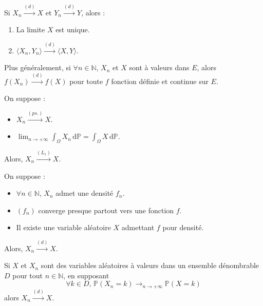 
  \begin{proposition}
    Si $X_n \overset{(d)}{\longrightarrow} X$ et $Y_n \overset{(d)}{\longrightarrow} Y$, alors :
    \begin{enumerate}[label={\bfseries(\roman*)}]
      \item La limite $X$ est unique.
      \item $\langle X_n, Y_n \rangle \overset{(d)}{\longrightarrow} \langle X, Y \rangle$.
    \end{enumerate}
    Plus généralement, si $\forall n \in \mathbb{N}$, $X_n$ et $X$ sont à valeurs dans $E$, alors $f(X_n) \overset{(d)}{\longrightarrow} f(X)$ pour toute $f$ fonction définie et continue sur $E$.
  \end{proposition}

  \begin{theorem}
    On suppose :
    \begin{itemize}
      \item $X_n \overset{(ps.)}{\longrightarrow} X$.
      \item $\lim_{n \rightarrow +\infty} \int_\Omega X_n \, \mathrm{d}\mathbb{P} = \int_\Omega X \, \mathrm{d}\mathbb{P}$.
    \end{itemize}
    Alors, $X_n \overset{(L_1)}{\longrightarrow} X$.
  \end{theorem}

  \begin{corollary}
    On suppose :
    \begin{itemize}
      \item $\forall n \in \mathbb{N}$, $X_n$ admet une densité $f_n$.
      \item $(f_n)$ converge presque partout vers une fonction $f$.
      \item Il existe une variable aléatoire $X$ admettant $f$ pour densité.
    \end{itemize}
    Alors, $X_n \overset{(d)}{\longrightarrow} X$.
  \end{corollary}

  \begin{corollary}
    Si $X$ et $X_n$ sont des variables aléatoires à valeurs dans un ensemble dénombrable $D$ pour tout $n \in \mathbb{N}$, en supposant
    \[ \forall k \in D, \, \mathbb{P}(X_n = k) \longrightarrow_{n\rightarrow+\infty} \mathbb{P}(X = k) \]
    alors $X_n \overset{(d)}{\longrightarrow} X$.
  \end{corollary}


